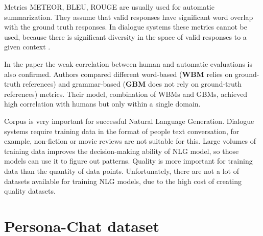 Metrics METEOR, BLEU, ROUGE are usually used for automatic summarization. They assume that valid responses have significant word overlap with the ground truth responses. In dialogue systems these metrics cannot be used, because there is significant diversity in the space of valid responses to a given context \cite{liu2016not}.

In the paper \cite{novikova2017we} the weak correlation between human and automatic evaluations is also confirmed. Authors compared different word-based (\textbf{WBM} relies on ground-truth references) and grammar-based (\textbf{GBM} does not rely on ground-truth references) metrics. Their model, combination of WBMs and GBMs, achieved high correlation with humans but only within a single domain.

Corpus is very important for successful Natural Language Generation. Dialogue systems require training data in the format of people text conversation, for example, non-fiction or movie reviews are not suitable for this. Large volumes of training data improves the decision-making ability of NLG model, so those models can use it to figure out patterns. Quality is more important for training data than the quantity of data points. Unfortunately, there are not a lot of datasets available for training NLG models, due to the high cost of creating quality datasets.  

\section{Persona-Chat dataset} \label{persona_chat_subsec}

